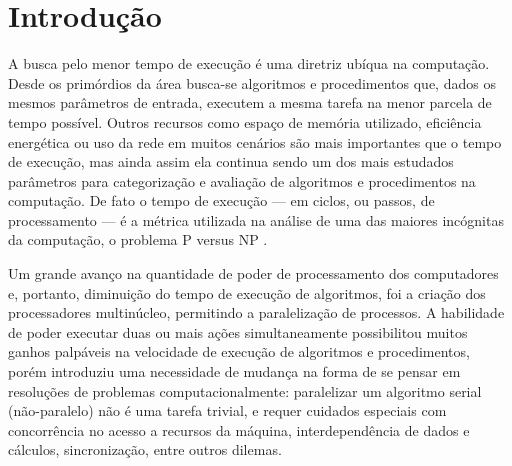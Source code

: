 \documentclass[12pt,
openright, 
oneside, %
a4paper,    %
brazil]{facom-ufu-abntex2}
\begin{document}

\tableofcontents*
\cleardoublepage






\textual





\chapter{Introdução}

A busca pelo menor tempo de execução é uma diretriz ubíqua na computação. Desde os primórdios da área busca-se algoritmos e procedimentos que, dados os mesmos parâmetros de entrada, executem a mesma tarefa na menor parcela de tempo possível. Outros recursos como espaço de memória utilizado, eficiência energética ou uso da rede em muitos cenários são mais importantes que o tempo de execução, mas ainda assim ela continua sendo um dos mais estudados parâmetros para categorização e avaliação de algoritmos e procedimentos na computação. De fato o tempo de execução --- em ciclos, ou passos, de processamento --- é a métrica utilizada na análise de uma das maiores incógnitas da computação, o problema P versus NP \cite{pVsNpOriginal1}\cite{pVsNpOriginal2}.

Um grande avanço na quantidade de poder de processamento dos computadores e, portanto, diminuição do tempo de execução de algoritmos, foi a criação dos processadores multinúcleo, permitindo a paralelização de processos. A habilidade de poder executar duas ou mais ações simultaneamente possibilitou muitos ganhos palpáveis na velocidade de execução de algoritmos e procedimentos, porém introduziu uma necessidade de mudança na forma de se pensar em resoluções de problemas computacionalmente: paralelizar um algoritmo serial (não-paralelo) não é uma tarefa trivial, e requer cuidados especiais com concorrência no acesso a recursos da máquina, interdependência de dados e cálculos, sincronização, entre outros dilemas.
\end{document}
